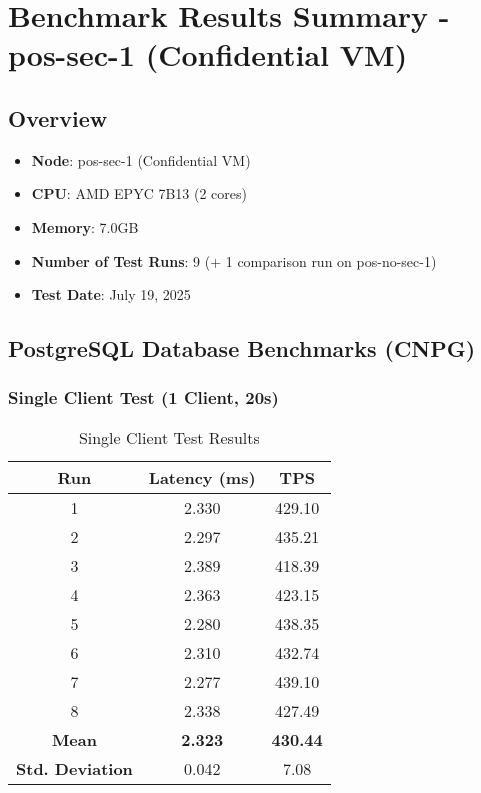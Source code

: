 \chapter{Benchmark Results Summary - pos-sec-1 (Confidential VM)}

\section{Overview}
\begin{itemize}
    \item \textbf{Node}: pos-sec-1 (Confidential VM)
    \item \textbf{CPU}: AMD EPYC 7B13 (2 cores)
    \item \textbf{Memory}: 7.0GB
    \item \textbf{Number of Test Runs}: 9 (+ 1 comparison run on pos-no-sec-1)
    \item \textbf{Test Date}: July 19, 2025
\end{itemize}

\section{PostgreSQL Database Benchmarks (CNPG)}

\subsection{Single Client Test (1 Client, 20s)}
\begin{table}[H]
\centering
\begin{tabular}{|c|c|c|}
\hline
\textbf{Run} & \textbf{Latency (ms)} & \textbf{TPS} \\
\hline
1 & 2.330 & 429.10 \\
2 & 2.297 & 435.21 \\
3 & 2.389 & 418.39 \\
4 & 2.363 & 423.15 \\
5 & 2.280 & 438.35 \\
6 & 2.310 & 432.74 \\
7 & 2.277 & 439.10 \\
8 & 2.338 & 427.49 \\
\hline
\textbf{Mean} & \textbf{2.323} & \textbf{430.44} \\
\textbf{Std. Deviation} & 0.042 & 7.08 \\
\hline
\end{tabular}
\caption{Single Client Test Results}
\end{table}

